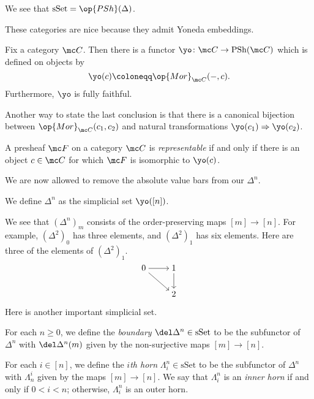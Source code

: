 \documentclass[../notes.tex]{subfiles}
\begin{document}
\begin{example}
	We see that $\mathrm{sSet}=\op{PSh}(\Delta)$.
\end{example}
These categories are nice because they admit Yoneda embeddings.
\begin{lemma}[Yoneda]
	Fix a category $\mc C$. Then there is a functor $\yo\colon\mc C\to\mathrm{PSh}(\mc C)$ which is defined on objects by
	\[\yo(c)\coloneqq\op{Mor}_{\mc C}(-,c).\]
	Furthermore, $\yo$ is fully faithful.
\end{lemma}
\begin{remark}
	Another way to state the last conclusion is that there is a canonical bijection between $\op{Mor}_{\mc C}(c_1,c_2)$ and natural transformations $\yo(c_1)\Rightarrow\yo(c_2)$.
\end{remark}
\begin{definition}[representable]
	A presheaf $\mc F$ on a category $\mc C$ is \textit{representable} if and only if there is an object $c\in\mc C$ for which $\mc F$ is isomorphic to $\yo(c)$.
\end{definition}
We are now allowed to remove the absolute value bars from our $\Delta^n$.
\begin{notation}
	We define $\Delta^n$ as the simplicial set $\yo([n])$.
\end{notation}
\begin{example}
	We see that $\left(\Delta^n\right)_m$ consists of the order-preserving maps $[m]\to[n]$. For example, $\left(\Delta^2\right)_0$ has three elements, and $\left(\Delta^2\right)_1$ has six elements. Here are three of the elements of $\left(\Delta^2\right)_1$.
	\[\begin{tikzcd}[cramped]
		0 & 1 \\
		& 2
		\arrow[from=1-1, to=1-2]
		\arrow[from=1-1, to=2-2]
		\arrow[from=1-2, to=2-2]
	\end{tikzcd}\]
\end{example}
Here is another important simplicial set.
\begin{definition}[boundary]
	For each $n\ge0$, we define the \textit{boundary} $\del\Delta^n\in\mathrm{sSet}$ to be the subfunctor of $\Delta^n$ with $\del\Delta^n(m)$ given by the non-surjective maps $[m]\to[n]$.
\end{definition}
\begin{definition}[horn]
	For each $i\in[n]$, we define the \textit{$i$th horn} $\Lambda_i^n\in\mathrm{sSet}$ to be the subfunctor of $\Delta^n$ with $\Lambda^i_n$ given by the maps $[m]\to[n]$. We say that $\Lambda_i^n$ is an \textit{inner horn} if and only if $0<i<n$; otherwise, $\Lambda_i^n$ is an outer horn.
\end{definition}
\end{document}
